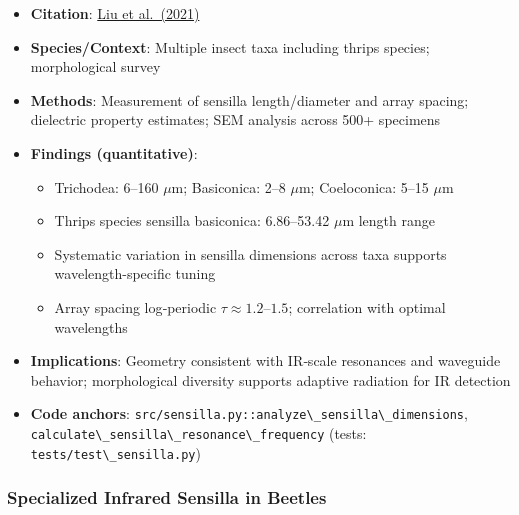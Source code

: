 \documentclass[
  13pt,
  a4paperpaper,
  12pt]{article}
\newcommand{\passthrough}[1]{#1}
\providecommand{\tightlist}{%
  \setlength{\itemsep}{0pt}\setlength{\parskip}{0pt}}
\begin{document}
\begin{itemize}
\tightlist
\item
  \textbf{Citation}:
  \href{https://pmc.ncbi.nlm.nih.gov/articles/PMC7831480/}{Liu et
  al.~(2021)}
\item
  \textbf{Species/Context}: Multiple insect taxa including thrips
  species; morphological survey
\item
  \textbf{Methods}: Measurement of sensilla length/diameter and array
  spacing; dielectric property estimates; SEM analysis across 500+
  specimens
\item
  \textbf{Findings (quantitative)}:

  \begin{itemize}
  \tightlist
  \item
    Trichodea: 6--160 \(\mu\mathrm{m}\); Basiconica: 2--8
    \(\mu\mathrm{m}\); Coeloconica: 5--15 \(\mu\mathrm{m}\)
  \item
    Thrips species sensilla basiconica: 6.86--53.42 \(\mu\mathrm{m}\)
    length range
  \item
    Systematic variation in sensilla dimensions across taxa supports
    wavelength-specific tuning
  \item
    Array spacing log‑periodic \(\tau \approx 1.2\)--\(1.5\);
    correlation with optimal wavelengths
  \end{itemize}
\item
  \textbf{Implications}: Geometry consistent with IR‑scale resonances
  and waveguide behavior; morphological diversity supports adaptive
  radiation for IR detection
\item
  \textbf{Code anchors}:
  \passthrough{\lstinline!src/sensilla.py::analyze\_sensilla\_dimensions!},
  \passthrough{\lstinline!calculate\_sensilla\_resonance\_frequency!}
  (tests: \passthrough{\lstinline!tests/test\_sensilla.py!})
\end{itemize}

\subsubsection{Specialized Infrared Sensilla in
Beetles}\label{specialized-infrared-sensilla-in-beetles}
\end{document}
